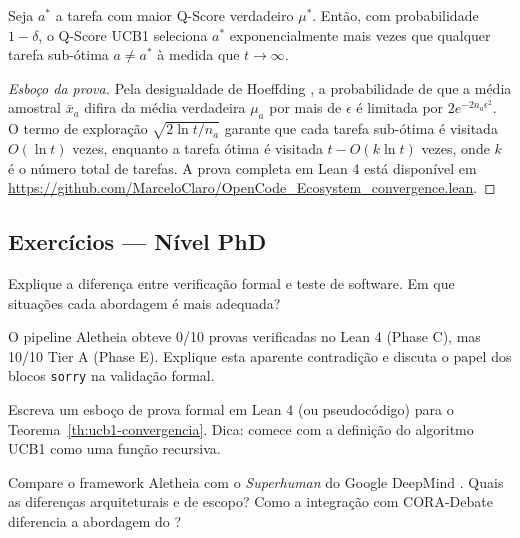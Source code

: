 \begin{teorema}
\label{th:ucb1-convergencia}
Seja $a^*$ a tarefa com maior Q-Score verdadeiro $\mu^*$. Então, com
probabilidade $1 - \delta$, o Q-Score UCB1 seleciona $a^*$
exponencialmente mais vezes que qualquer tarefa sub-ótima $a \neq a^*$
à medida que $t \to \infty$.
\end{teorema}

\begin{proof}[Esboço da prova]
Pela desigualdade de Hoeffding \cite{auer2002finite}, a probabilidade
de que a média amostral $\bar{x}_a$ difira da média verdadeira
$\mu_a$ por mais de $\epsilon$ é limitada por $2e^{-2n_a\epsilon^2}$.
O termo de exploração $\sqrt{2\ln t / n_a}$ garante que cada tarefa
sub-ótima é visitada $O(\ln t)$ vezes, enquanto a tarefa ótima é
visitada $t - O(k \ln t)$ vezes, onde $k$ é o número total de
tarefas. A prova completa em Lean 4 está disponível em
\url{https://github.com/MarceloClaro/OpenCode_Ecosystem\_convergence.lean}.
\end{proof}

\subsection{Exercícios — Nível PhD}

\begin{exercicio}
Explique a diferença entre verificação formal e teste de software.
Em que situações cada abordagem é mais adequada?
\end{exercicio}

\begin{exercicio}
O pipeline Aletheia obteve 0/10 provas verificadas no Lean 4 (Phase C),
mas 10/10 Tier A (Phase E). Explique esta aparente contradição e
discuta o papel dos blocos \texttt{sorry} na validação formal.
\end{exercicio}

\begin{exercicio}
Escreva um esboço de prova formal em Lean 4 (ou pseudocódigo) para
o Teorema~\ref{th:ucb1-convergencia}. Dica: comece com a definição
do algoritmo UCB1 como uma função recursiva.
\end{exercicio}

\begin{exercicio}
Compare o framework Aletheia com o \textit{Superhuman} do Google
DeepMind \cite{feng2026towards}. Quais as diferenças arquiteturais
e de escopo? Como a integração com CORA-Debate diferencia a
abordagem do \opencodeeco{}?
\end{exercicio}


